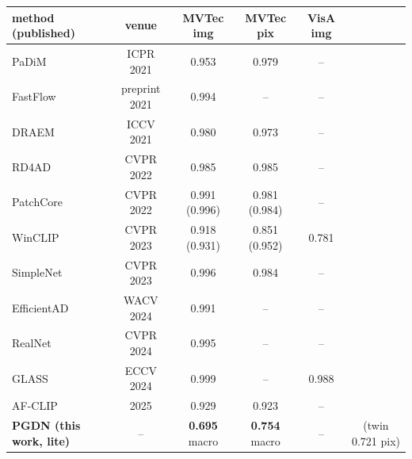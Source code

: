 \setlength{\tabcolsep}{3pt}
\begin{tabular}{@{}lccccc@{}}
\toprule
method (published) & venue & MVTec img & MVTec pix & VisA img &  \\
\midrule
PaDiM~\cite{ref1} & ICPR 2021 & 0.953 & 0.979 & -- \\
FastFlow~\cite{ref9} & preprint 2021 & 0.994 & -- & -- \\
DRAEM~\cite{ref6} & ICCV 2021 & 0.980 & 0.973 & -- \\
RD4AD~\cite{ref3} & CVPR 2022 & 0.985 & 0.985 & -- \\
PatchCore~\cite{ref2} & CVPR 2022 & 0.991 (0.996) & 0.981 (0.984) & -- \\
WinCLIP~\cite{ref10} & CVPR 2023 & 0.918 (0.931) & 0.851 (0.952) & 0.781 \\
SimpleNet~\cite{ref4} & CVPR 2023 & 0.996 & 0.984 & -- \\
EfficientAD~\cite{ref5} & WACV 2024 & 0.991 & -- & -- \\
RealNet~\cite{ref7} & CVPR 2024 & 0.995 & -- & -- \\
GLASS~\cite{ref8} & ECCV 2024 & 0.999 & -- & 0.988 \\
AF-CLIP~\cite{ref20} & 2025 & 0.929 & 0.923 & -- \\
\textbf{PGDN (this work, lite)} & -- & \textbf{0.695} macro & \textbf{0.754} macro & -- & (twin 0.721 pix) \\
\bottomrule
\end{tabular}
